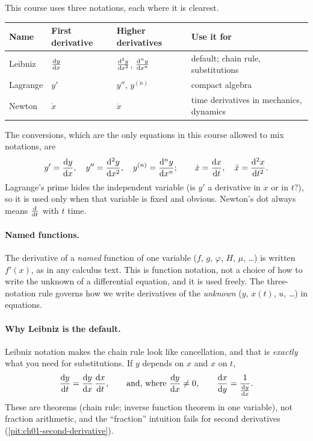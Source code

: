This course uses three notations, each where it is clearest.

\begin{center}
\begin{tabular}{@{}llll@{}}
  \toprule
  Name & First derivative & Higher derivatives & Use it for \\
  \midrule
  Leibniz  & $\frac{\mathrm{d}y}{\mathrm{d}x}$ & $\frac{\mathrm{d}^{2}y}{\mathrm{d}x^{2}}$, $\frac{\mathrm{d}^{n}y}{\mathrm{d}x^{n}}$ & default; chain rule, substitutions \\
  Lagrange & $y'$ & $y''$, $y^{(n)}$ & compact algebra \\
  Newton   & $\dot{x}$ & $\ddot{x}$ & time derivatives in mechanics, dynamics \\
  \bottomrule
\end{tabular}
\end{center}

\noindent The conversions, which are the only equations in this course allowed
to mix notations, are
\begin{equation}\label{eq:ch01-conversions}
  y' = \frac{\mathrm{d}y}{\mathrm{d}x},\quad y'' = \frac{\mathrm{d}^{2}y}{\mathrm{d}x^{2}},\quad y^{(n)} = \frac{\mathrm{d}^{n}y}{\mathrm{d}x^{n}};
  \qquad
  \dot{x} = \frac{\mathrm{d}x}{\mathrm{d}t},\quad \ddot{x} = \frac{\mathrm{d}^{2}x}{\mathrm{d}t^{2}}.
\end{equation}
Lagrange's prime hides the independent variable (is $y'$ a derivative in $x$
or in $t$?), so it is used only when that variable is fixed and obvious.
Newton's dot always means $\frac{\mathrm{d}}{\mathrm{d}t}$ with $t$ time.

\paragraph{Named functions.} The derivative of a \emph{named} function of one
variable ($f$, $g$, $\varphi$, $H$, $\mu$, \dots) is written $f'(x)$, as in any
calculus text. This is function notation, not a choice of how to write the
unknown of a differential equation, and it is used freely. The three-notation
rule governs how we write derivatives of the \emph{unknown} ($y$, $x(t)$,
$u$, \dots) in equations.

\paragraph{Why Leibniz is the default.} Leibniz notation makes the chain rule
look like cancellation, and that is \emph{exactly} what you need for
substitutions. If $y$ depends on $x$ and $x$ on $t$,
\begin{equation}\label{eq:ch01-chain}
  \frac{\mathrm{d}y}{\mathrm{d}t} = \frac{\mathrm{d}y}{\mathrm{d}x}\,\frac{\mathrm{d}x}{\mathrm{d}t},
  \qquad\text{and, where } \frac{\mathrm{d}y}{\mathrm{d}x}\neq 0,\qquad
  \frac{\mathrm{d}x}{\mathrm{d}y} = \frac{1}{\frac{\mathrm{d}y}{\mathrm{d}x}} .
\end{equation}
These are theorems (chain rule; inverse function theorem in one variable), not
fraction arithmetic, and the ``fraction'' intuition fails for second
derivatives (\cref{pit:ch01-second-derivative}).

